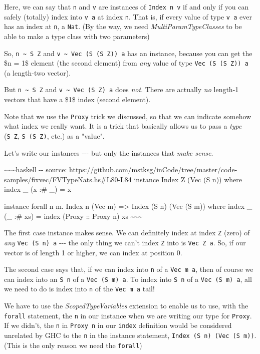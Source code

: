 \documentclass[]{article}
\begin{document}
Here, we can say that \texttt{n} and \texttt{v} are instances of
\texttt{Index\ n\ v} if and only if you can safely (totally) index into
\texttt{v\ a} at index \texttt{n}. That is, if every value of type \texttt{v\ a}
ever has an index at \texttt{n}, a \texttt{Nat}. (By the way, we need
\emph{MultiParamTypeClasses} to be able to make a type class with two
parameters)

So, \texttt{n\ \textasciitilde{}\ S\ Z} and
\texttt{v\ \textasciitilde{}\ Vec\ (S\ (S\ Z))\ a} has an instance, because you
can get the \$n = 1\$ element (the second element) from \emph{any} value of type
\texttt{Vec\ (S\ (S\ Z))\ a} (a length-two vector).

But \texttt{n\ \textasciitilde{}\ S\ Z} and
\texttt{v\ \textasciitilde{}\ Vec\ (S\ Z)\ a} does \emph{not}. There are
actually \emph{no} length-1 vectors that have a \$1\$ index (second element).

Note that we use the \texttt{Proxy} trick we discussed, so that we can indicate
somehow what index we really want. It is a trick that basically allows us to
pass a \emph{type} (\texttt{S\ Z}, \texttt{S\ (S\ Z)}, etc.) as a "value".

Let's write our instances -\/-\/- but only the instances that \emph{make sense}.

\textasciitilde{}\textasciitilde{}\textasciitilde{}haskell -\/- source:
https://github.com/mstksg/inCode/tree/master/code-samples/fixvec/FVTypeNats.hs\#L80-L84
instance Index Z (Vec (S n)) where index \_ (x :\# \_) = x

instance forall n m. Index n (Vec m) =\textgreater{} Index (S n) (Vec (S m))
where index \_ (\_ :\# xs) = index (Proxy :: Proxy n) xs
\textasciitilde{}\textasciitilde{}\textasciitilde{}

The first case instance makes sense. We can definitely index at index \texttt{Z}
(zero) of \emph{any} \texttt{Vec\ (S\ n)\ a} -\/-\/- the only thing we can't
index \texttt{Z} into is \texttt{Vec\ Z\ a}. So, if our vector is of length 1 or
higher, we can index at position 0.

The second case says that, if we can index into \texttt{n} of a
\texttt{Vec\ m\ a}, then of course we can index into an \texttt{S\ n} of a
\texttt{Vec\ (S\ m)\ a}. To index into \texttt{S\ n} of a
\texttt{Vec\ (S\ m)\ a}, all we need to do is index into \texttt{n} of the
\texttt{Vec\ m\ a} tail!

We have to use the \emph{ScopedTypeVariables} extension to enable us to use,
with the \texttt{forall} statement, the \texttt{n} in our instance when we are
writing our type for \texttt{Proxy}. If we didn't, the \texttt{n} in
\texttt{Proxy\ n} in our \texttt{index} definition would be considered unrelated
by GHC to the \texttt{n} in the instance statement,
\texttt{Index\ (S\ n)\ (Vec\ (S\ m))}. (This is the only reason we need the
\texttt{forall})
\end{document}
